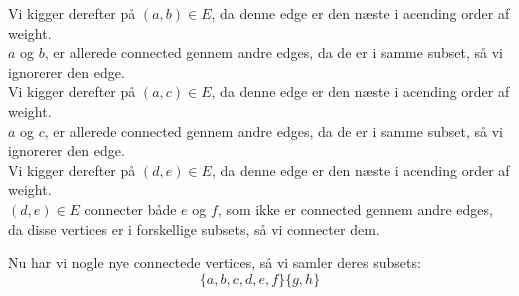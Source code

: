 \documentclass[a4paper,12pt]{article}
\begin{document}
Vi kigger derefter på $(a,b)\in E$, da denne edge er den næste i acending order af weight.\\
$a$ og $b$, er allerede connected gennem andre edges, da de er i samme subset, så vi ignorerer den edge.\\
Vi kigger derefter på $(a,c)\in E$, da denne edge er den næste i acending order af weight.\\
$a$ og $c$, er allerede connected gennem andre edges, da de er i samme subset, så vi ignorerer den edge.\\
Vi kigger derefter på $(d,e)\in E$, da denne edge er den næste i acending order af weight.\\
$(d,e)\in E$ connecter både $e$ og $f$, som ikke er connected gennem andre edges, da disse vertices er i forskellige subsets, så vi connecter dem.
\begin{figure}[H]
    \centering
    \caption*{}
\end{figure}
Nu har vi nogle nye connectede vertices, så vi samler deres subsets:
\[\{a,b,c,d,e,f\}\{g,h\}\]
\end{document}
